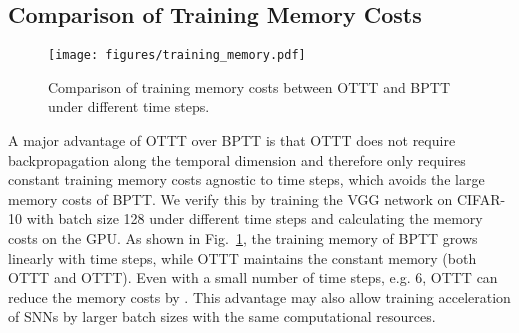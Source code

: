 \documentclass{article}
\begin{document}
\subsection{Comparison of Training Memory Costs}
\vspace{-2mm}

\begin{figure}[h]
\vspace{-1.5mm}
    \centering
    \texttt{[image: figures/training\_memory.pdf]}
    \caption{Comparison of training memory costs between OTTT and BPTT under different time steps.}
    \label{fig:training memory}
\vspace{-1.5mm}
\end{figure}

A major advantage of OTTT over BPTT is that OTTT does not require backpropagation along the temporal dimension and therefore only requires constant training memory costs agnostic to time steps, which avoids the large memory costs of BPTT. We verify this by training the VGG network on CIFAR-10 with batch size 128 under different time steps and calculating the memory costs on the GPU. As shown in Fig.~\ref{fig:training memory}, the training memory of BPTT grows linearly with time steps, while OTTT maintains the constant memory (both OTTT and OTTT). Even with a small number of time steps, e.g. 6, OTTT can reduce the memory costs by . This advantage may also allow training acceleration of SNNs by larger batch sizes with the same computational resources.
\end{document}
